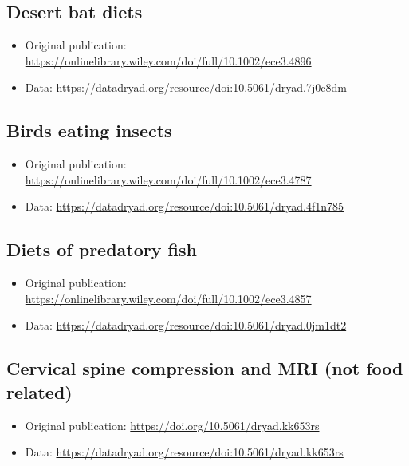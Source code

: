 \documentclass[]{book}
\providecommand{\tightlist}{%
  \setlength{\itemsep}{0pt}\setlength{\parskip}{0pt}}
\begin{document}
\hypertarget{desert-bat-diets-1}{%
\subsection{Desert bat diets}\label{desert-bat-diets-1}}

\begin{itemize}
\tightlist
\item
  Original publication: \url{https://onlinelibrary.wiley.com/doi/full/10.1002/ece3.4896}
\item
  Data: \url{https://datadryad.org/resource/doi:10.5061/dryad.7j0c8dm}
\end{itemize}

\hypertarget{birds-eating-insects}{%
\subsection{Birds eating insects}\label{birds-eating-insects}}

\begin{itemize}
\tightlist
\item
  Original publication: \url{https://onlinelibrary.wiley.com/doi/full/10.1002/ece3.4787}
\item
  Data: \url{https://datadryad.org/resource/doi:10.5061/dryad.4f1n785}
\end{itemize}

\hypertarget{diets-of-predatory-fish}{%
\subsection{Diets of predatory fish}\label{diets-of-predatory-fish}}

\begin{itemize}
\tightlist
\item
  Original publication: \url{https://onlinelibrary.wiley.com/doi/full/10.1002/ece3.4857}
\item
  Data: \url{https://datadryad.org/resource/doi:10.5061/dryad.0jm1dt2}
\end{itemize}

\hypertarget{cervical-spine-compression-and-mri-not-food-related}{%
\subsection{Cervical spine compression and MRI (not food related)}\label{cervical-spine-compression-and-mri-not-food-related}}

\begin{itemize}
\tightlist
\item
  Original publication: \url{https://doi.org/10.5061/dryad.kk653rs}
\item
  Data: \url{https://datadryad.org/resource/doi:10.5061/dryad.kk653rs}
\end{itemize}
\end{document}
